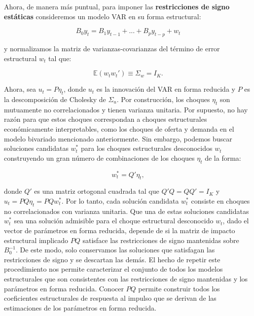 \documentclass[
]{book}
\begin{document}
Ahora, de manera más puntual, para imponer las \textbf{restricciones de signo estáticas} consideremos un modelo VAR en su forma estructural:

\begin{equation}
B_0 y_t = B_1 y_{t-1} + ... + B_p y_{t-p} + w_t
\end{equation}

y normalizamos la matriz de varianzas-covarianzas del término de error estructural \(w_t\) tal que:

\begin{equation}
\mathbb{E}(w_t w_t') \equiv \Sigma_w = I_K.
\end{equation}

Ahora, sea \(u_t = P \eta_t\), donde \(u_t\) es la innovación del VAR en forma reducida y \(P\) es la descomposición de Cholesky de \(\Sigma_u\). Por construcción, los choques \(\eta_t\) son mutuamente no correlacionados y tienen varianza unitaria. Por supuesto, no hay razón para que estos choques correspondan a choques estructurales económicamente interpretables, como los choques de oferta y demanda en el modelo bivariado mencionado anteriormente. Sin embargo, podemos buscar soluciones candidatas \(w_t^*\) para los choques estructurales desconocidos \(w_t\) construyendo un gran número de combinaciones de los choques \(\eta_t\) de la forma:

\begin{equation}
w_t^* = Q' \eta_t, 
\end{equation}

donde \(Q'\) es una matriz ortogonal cuadrada tal que \(Q'Q = QQ' = I_K\) y \(u_t = PQ \eta_t = PQw_t^*\). Por lo tanto, cada solución candidata \(w_t^*\) consiste en choques no correlacionados con varianza unitaria. Que una de estas soluciones candidatas \(w_t^*\) sea una solución admisible para el choque estructural desconocido \(w_t\), dado el vector de parámetros en forma reducida, depende de si la matriz de impacto estructural implicado \(PQ\) satisface las restricciones de signo mantenidas sobre \(B_0^{-1}\). De este modo, solo conservamos las soluciones que satisfagan las restricciones de signo y se descartan las demás. El hecho de repetir este procedimiento nos permite caracterizar el conjunto de todos los modelos estructurales que son consistentes con las restricciones de signo mantenidas y los parámetros en forma reducida. Conocer \(PQ\) permite construir todos los coeficientes estructurales de respuesta al impulso que se derivan de las estimaciones de los parámetros en forma reducida.
\end{document}
